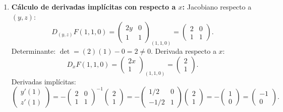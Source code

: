 \documentclass[11pt,a4paper]{article}
\begin{document}
\begin{enumerate}[label=\textbf{\arabic*.}]
\item \textbf{Cálculo de derivadas implícitas con respecto a $x$:}
Jacobiano respecto a $(y,z)$:
\begin{equation*}
D_{(y,z)}F(1,1,0) = \begin{pmatrix} 2y & 0 \\ 1 & 1 \end{pmatrix}_{(1,1,0)} = \begin{pmatrix} 2 & 0 \\ 1 & 1 \end{pmatrix}.
\end{equation*}
Determinante: $\det = (2)(1) - 0 = 2 \neq 0$.
Derivada respecto a $x$:
\begin{equation*}
D_x F(1,1,0) = \begin{pmatrix} 2x \\ 1 \end{pmatrix}_{(1,1,0)} = \begin{pmatrix} 2 \\ 1 \end{pmatrix}.
\end{equation*}
Derivadas implícitas:
\begin{equation*}
\begin{pmatrix} y'(1) \\ z'(1) \end{pmatrix} = - \begin{pmatrix} 2 & 0 \\ 1 & 1 \end{pmatrix}^{-1} \begin{pmatrix} 2 \\ 1 \end{pmatrix} = - \begin{pmatrix} 1/2 & 0 \\ -1/2 & 1 \end{pmatrix} \begin{pmatrix} 2 \\ 1 \end{pmatrix} = - \begin{pmatrix} 1 \\ 0 \end{pmatrix} = \begin{pmatrix} -1 \\ 0 \end{pmatrix}.
\end{equation*}
\end{enumerate}
\end{document}
